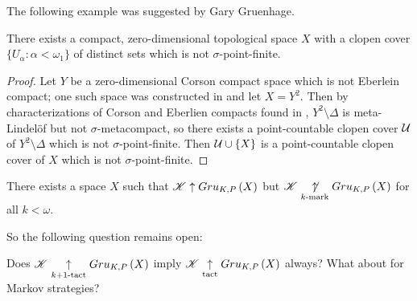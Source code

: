 The following example was suggested by Gary Gruenhage.

\begin{thm}
  There exists a compact, zero-dimensional topological space $X$
  with a clopen cover $\{U_\alpha : \alpha<\omega_1\}$ of distinct
  sets which is not $\sigma$-point-finite.
\end{thm}

\begin{proof}
  Let $Y$ be a zero-dimensional Corson compact space which is not Eberlein
  compact; one such space was constructed in \cite{Marciszewski1991291}
  and let $X=Y^2$.
  Then by characterizations of Corson and Eberlien compacts found in
  \cite{MR752278},
  $Y^2\setminus\Delta$ is meta-Lindel\"of but not $\sigma$-metacompact, so
  there exists a point-countable clopen cover $\mathcal{U}$ of $Y^2\setminus\Delta$
  which is not $\sigma$-point-finite. Then $\mathcal{U}\cup\{X\}$ is a point-countable
  clopen cover of $X$ which is not $\sigma$-point-finite.
\end{proof}

\begin{cor}
  There exists a space $X$ such that $\mathscr{K}\uparrow Gru_{K,P}\left({X}\right)$ but
  $\mathscr{K}\underset{k\text{-mark}}{\not\uparrow} Gru_{K,P}\left({X}\right)$ for all $k<\omega$.
\end{cor}

So the following question remains open:

\begin{ques}
  Does $\mathscr{K}\underset{k+1\text{-tact}}{\uparrow}Gru_{K,P}\left({X}\right)$ imply
  $\mathscr{K}\underset{\text{tact}}{\uparrow}Gru_{K,P}\left({X}\right)$ always? What about for Markov strategies?
\end{ques}
